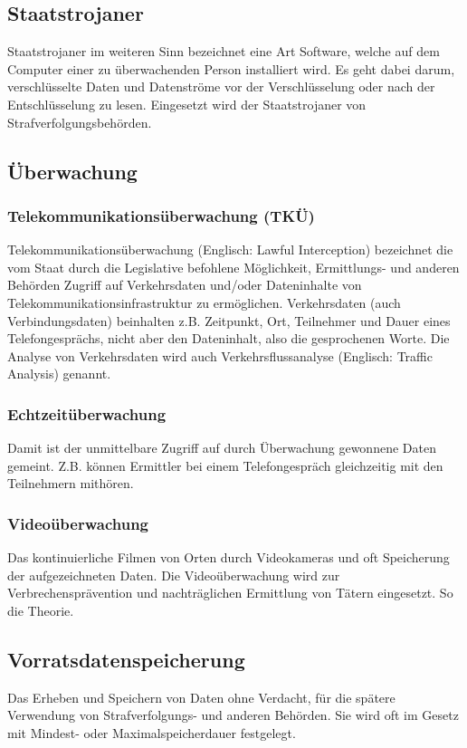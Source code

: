 	\subsection{Staatstrojaner}
	  Staatstrojaner im weiteren Sinn bezeichnet eine Art Software, welche auf 
	  dem Computer einer zu überwachenden Person installiert wird. Es geht 
	  dabei darum, verschlüsselte Daten und Datenströme vor der 
	  Verschlüsselung oder nach der Entschlüsselung zu lesen. Eingesetzt 
	  wird der Staatstrojaner von Strafverfolgungsbehörden. 
	
	\subsection{Überwachung}
	  \subsubsection{Telekommunikationsüberwachung (TKÜ)}
	    Telekommunikationsüberwachung (Englisch: Lawful Interception) 
	    bezeichnet die vom Staat durch die Legislative befohlene Möglichkeit, 
	    Ermittlungs- und anderen Behörden Zugriff auf Verkehrsdaten und/oder 
	    Dateninhalte von Telekommunikationsinfrastruktur zu ermöglichen. 
	    Verkehrsdaten (auch Verbindungsdaten) beinhalten z.B. Zeitpunkt, Ort, 
	    Teilnehmer und Dauer eines Telefongesprächs, nicht aber den 
	    Dateninhalt, also die gesprochenen Worte. Die Analyse von Verkehrsdaten 
	    wird auch Verkehrsflussanalyse (Englisch: Traffic Analysis) genannt. 
	
	  \subsubsection{Echtzeitüberwachung }
	    Damit ist der unmittelbare Zugriff auf durch Überwachung gewonnene 
	    Daten gemeint. Z.B. können Ermittler bei einem Telefongespräch 
	    gleichzeitig mit den Teilnehmern mithören. 
	  
	  \subsubsection{Videoüberwachung}
	    Das kontinuierliche Filmen von Orten durch Videokameras und oft 
	    Speicherung der aufgezeichneten Daten. Die Videoüberwachung wird zur 
	    Verbrechensprävention und nachträglichen Ermittlung von Tätern 
	    eingesetzt. So die Theorie. 
	  
	\subsection{Vorratsdatenspeicherung}
	  Das Erheben und Speichern von Daten ohne Verdacht, für die spätere 
	  Verwendung von Strafverfolgungs- und anderen Behörden. Sie wird oft im 
	  Gesetz mit Mindest- oder Maximalspeicherdauer festgelegt. 
	
